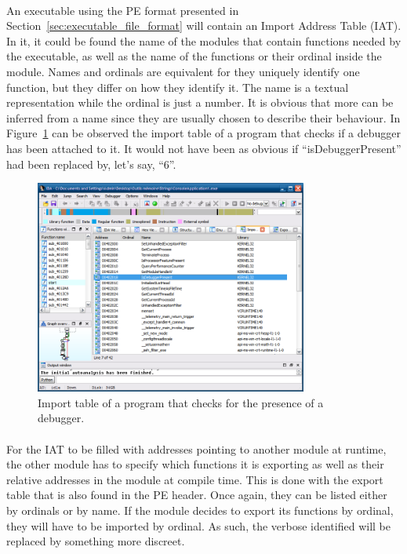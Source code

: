 \paragraph{}
An executable using the PE format presented in Section~\ref{sec:executable_file_format} will contain an Import Address Table (IAT). In it, it could be found the name of the modules that contain functions needed by the executable, as well as the name of the functions or their ordinal inside the module. Names and ordinals are equivalent for they uniquely identify one function, but they differ on how they identify it. The name is a textual representation while the ordinal is just a number. It is obvious that more can be inferred from a name since they are usually chosen to describe their behaviour. In Figure~\ref{fig:import_table} can be observed the import table of a program that checks if a debugger has been attached to it. It would not have been as obvious if “isDebuggerPresent” had been replaced by, let's say, “6”.

\begin{figure}[!htb]
	\centering
	\includegraphics[width=0.8\textwidth]{reverse_engineering/import_table.png}
	\caption{Import table of a program that checks for the presence of a debugger.}
	\label{fig:import_table}
\end{figure}


\paragraph{}
For the IAT to be filled with addresses pointing to another module at runtime, the other module has to specify which functions it is exporting as well as their relative addresses in the module at compile time. This is done with the export table that is also found in the PE header. Once again, they can be listed either by ordinals or by name. If the module decides to export its functions by ordinal, they will have to be imported by ordinal. As such, the verbose identified will be replaced by something more discreet.


